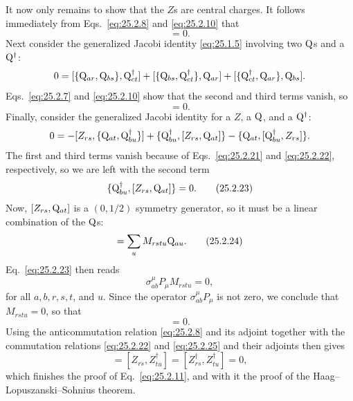 It now only remains to show that the \(Z\)s are central charges. It follows
immediately from Eqs.~\eqref{eq:25.2.8} and \eqref{eq:25.2.10} that
\begin{equation}
[P_\mu,Z_{rs}]=0.
\tag{25.2.21}\label{eq:25.2.21}
\end{equation}
Next consider the generalized Jacobi identity \eqref{eq:25.1.5} involving
two \(\mathrm{Q}\)s and a \(\mathrm{Q}^\dagger\):
\[
0
=[\{\mathrm{Q}_{ar},\mathrm{Q}_{bs}\},\mathrm{Q}_{ct}^\dagger]
+[\{\mathrm{Q}_{bs},\mathrm{Q}_{ct}^\dagger\},\mathrm{Q}_{ar}]
+[\{\mathrm{Q}_{ct}^\dagger,\mathrm{Q}_{ar}\},\mathrm{Q}_{bs}].
\]
Eqs.~\eqref{eq:25.2.7} and \eqref{eq:25.2.10} show that the second and
third terms vanish, so
\begin{equation}
[Z_{rs},\WeylQ_{ct}^\dagger]=0.
\tag{25.2.22}\label{eq:25.2.22}
\end{equation}
Finally, consider the generalized Jacobi identity for a \(Z\), a
\(\mathrm{Q}\), and a \(\mathrm{Q}^\dagger\):
\[
0
=-[Z_{rs},\{\mathrm{Q}_{at},\mathrm{Q}_{bu}^\dagger\}]
+\{\mathrm{Q}_{bu}^\dagger,[Z_{rs},\mathrm{Q}_{at}]\}
-\{\mathrm{Q}_{at},[\mathrm{Q}_{bu}^\dagger,Z_{rs}]\}.
\]
The first and third terms vanish because of Eqs.~\eqref{eq:25.2.21} and
\eqref{eq:25.2.22}, respectively, so we are left with the second term
\begin{equation}
\{\mathrm{Q}_{bu}^\dagger,[Z_{rs},\mathrm{Q}_{at}]\}=0.
\tag{25.2.23}\label{eq:25.2.23}
\end{equation}
Now, \([Z_{rs},\mathrm{Q}_{at}]\) is a \((0,1/2)\) symmetry generator, so it
must be a linear combination of the \(\mathrm{Q}\)s:
\begin{equation}
[Z_{rs},\WeylQ_{at}]
=\sum_uM_{rstu}\WeylQ_{au}.
\tag{25.2.24}\label{eq:25.2.24}
\end{equation}
Eq.~\eqref{eq:25.2.23} then reads
\[
\sigma^\mu_{ab}P_\mu M_{rstu}=0,
\]
for all \(a,b,r,s,t\), and \(u\). Since the operator
\(\sigma^\mu_{ab}P_\mu\) is not zero, we conclude that \(M_{rstu}=0\), so
that
\begin{equation}
[Z_{rs},\WeylQ_{at}]=0.
\tag{25.2.25}\label{eq:25.2.25}
\end{equation}
Using the anticommutation relation \eqref{eq:25.2.8} and its adjoint
together with the commutation relations \eqref{eq:25.2.22} and
\eqref{eq:25.2.25} and their adjoints then gives
\begin{equation}
[Z_{rs},Z_{tu}]
=[Z_{rs},Z_{tu}^\dagger]
=[Z_{rs}^\dagger,Z_{tu}^\dagger]=0,
\tag{25.2.26}\label{eq:25.2.26}
\end{equation}
which finishes the proof of Eq.~\eqref{eq:25.2.11}, and with it the proof
of the Haag--Lopuszanski--Sohnius theorem.

